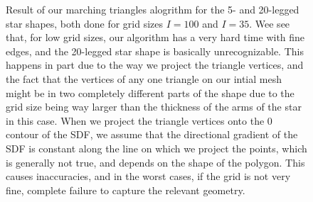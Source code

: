 \documentclass[acmtog]{acmart}
\begin{document}
\begin{figure}[H]
\begin{subfigure}{0.22\textwidth}
  \end{subfigure}
  \caption{Result of our marching triangles alogrithm for the 5- and 20-legged star shapes, both done for grid sizes $I = 100$ and $I = 35$. Wee see that, for low grid sizes, our algorithm has a very hard time with fine edges, and the 20-legged star shape is basically unrecognizable. This happens in part due to the way we project the triangle vertices, and the fact that the vertices of any one triangle on our intial mesh might be in two completely different parts of the shape due to the grid size being way larger than the thickness of the arms of the star in this case. When we project the triangle vertices onto the 0 contour of the SDF, we assume that the directional gradient of the SDF is constant along the line on which we project the points, which is generally not true, and depends on the shape of the polygon. This causes inaccuracies, and in the worst cases, if the grid is not very fine, complete failure to capture the relevant geometry.}
\end{figure}
\end{document}
